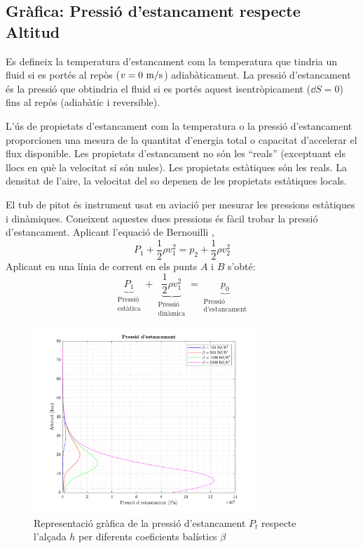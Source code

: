\newpage
\subsection{Gràfica: Pressió d'estancament respecte Altitud}
Es defineix la temperatura d'estancament com la temperatura que tindria un fluid si es portés al repòs ($v=0 \ \meter/\second$) adiabàticament. La pressió d'estancament és la pressió que obtindria el fluid si es portés aquest isentròpicament ($\dd S = 0$) fins al repòs (adiabàtic i reversible).

L'ús de propietats d'estancament com la temperatura o la pressió d'estancament proporcionen una mesura de la quantitat d’energia total o capacitat d'accelerar el flux disponible. Les propietats d’estancament no són les ``reals'' (exceptuant els llocs en què la velocitat sí són nules). Les propietats estàtiques són les reals. 
La densitat de l’aire, la velocitat del so depenen de les propietats estàtiques locals.

El tub de pitot és instrument usat en aviació per mesurar les pressions estàtiques i dinàmiques. Coneixent aquestes dues pressions és fàcil trobar la pressió d'estancament. Aplicant l'equació de Bernouilli \cite{anderson_2},
\begin{equation*}
    P_1 + \frac{1}{2} \rho v^2_1 = p_2 + \frac{1}{2} \rho v^2_2
\end{equation*}
Aplicant en una línia de corrent en els punts $A$ i $B$ s'obté:
\begin{equation}
    \underbrace{P_1}_{\substack{\text{Pressió} \\ \text{estàtica}}} + \underbrace{\frac{1}{2} \rho v^2_1}_{\substack{\text{Pressió} \\ \text{dinàmica}}} = \underbrace{p_0}_{\substack{\text{Pressió} \\ \text{d'estancament}}}
\end{equation}

\begin{figure}[ht]
    \centering
    \includegraphics[width=0.75\textwidth]{imagenes/01_ballistic_graficas/pressio_estancament.pdf}
    \caption{Representació gràfica de la pressió d'estancament $P_t$ respecte l'alçada $h$ per diferents coeficients balístics $\beta$}
    \label{fig:pressio_estancament}
\end{figure}

